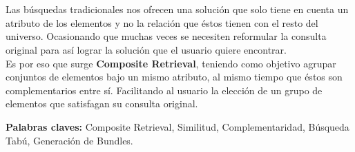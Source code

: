 \chapter*{\runtitulo}

\noindent Las búsquedas tradicionales nos ofrecen una solución que solo tiene en cuenta un atributo de los elementos y no la relación que éstos tienen con el resto del universo. Ocasionando que muchas veces se necesiten reformular la consulta original para así lograr la solución que el usuario quiere encontrar.\\
Es por eso que surge \textbf{Composite Retrieval}, teniendo como objetivo agrupar conjuntos de elementos bajo un mismo atributo, al mismo tiempo que éstos son complementarios entre sí. Facilitando al usuario la elección de un grupo de elementos que satisfagan su consulta original.

\bigskip

\noindent\textbf{Palabras claves:} Composite Retrieval, Similitud, Complementaridad, Búsqueda Tabú, Generación de Bundles.